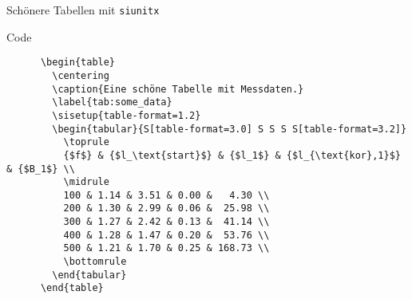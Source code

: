 \begin{frame}[fragile]{
  Schönere Tabellen mit \texttt{siunitx}
  \hfill
}
  \fontsize{8}{6}
  \begin{block}{Code}
    \begin{lstlisting}
      \begin{table}
        \centering
        \caption{Eine schöne Tabelle mit Messdaten.}
        \label{tab:some_data}
        \sisetup{table-format=1.2}
        \begin{tabular}{S[table-format=3.0] S S S S[table-format=3.2]}
          \toprule
          {$f$} & {$l_\text{start}$} & {$l_1$} & {$l_{\text{kor},1}$} & {$B_1$} \\
          \midrule
          100 & 1.14 & 3.51 & 0.00 &   4.30 \\
          200 & 1.30 & 2.99 & 0.06 &  25.98 \\
          300 & 1.27 & 2.42 & 0.13 &  41.14 \\
          400 & 1.28 & 1.47 & 0.20 &  53.76 \\
          500 & 1.21 & 1.70 & 0.25 & 168.73 \\
          \bottomrule
        \end{tabular}
      \end{table}
    \end{lstlisting}
  \end{block}
\end{frame}

